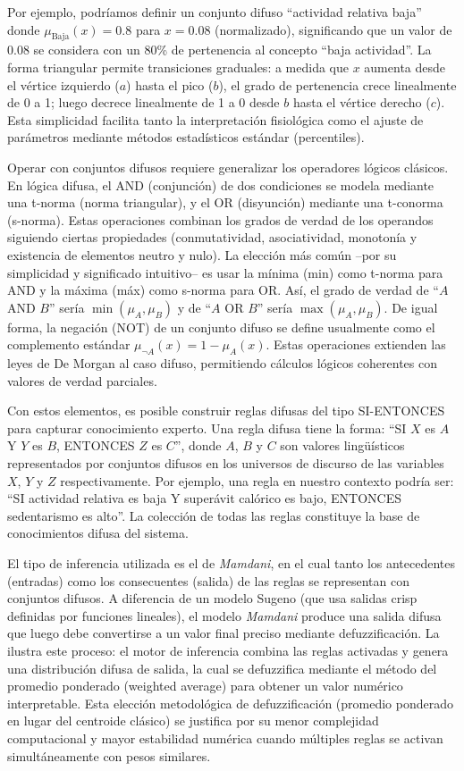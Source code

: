 Por ejemplo, podríamos definir un conjunto difuso ``actividad relativa baja'' donde $\mu_{\text{Baja}}(x) = 0.8$ para $x = 0.08$ (normalizado), significando que un valor de 0.08 se considera con un 80\% de pertenencia al concepto ``baja actividad''. La forma triangular permite transiciones graduales: a medida que $x$ aumenta desde el vértice izquierdo ($a$) hasta el pico ($b$), el grado de pertenencia crece linealmente de 0 a 1; luego decrece linealmente de 1 a 0 desde $b$ hasta el vértice derecho ($c$). Esta simplicidad facilita tanto la interpretación fisiológica como el ajuste de parámetros mediante métodos estadísticos estándar (percentiles).

Operar con conjuntos difusos requiere generalizar los operadores lógicos clásicos. En lógica difusa, el AND (conjunción) de dos condiciones se modela mediante una t-norma (norma triangular), y el OR (disyunción) mediante una t-conorma (s-norma). Estas operaciones combinan los grados de verdad de los operandos siguiendo ciertas propiedades (conmutatividad, asociatividad, monotonía y existencia de elementos neutro y nulo). La elección más común --por su simplicidad y significado intuitivo-- es usar la mínima (min) como t-norma para AND y la máxima (máx) como s-norma para OR. Así, el grado de verdad de ``$A$ AND $B$'' sería $\min(\mu_A, \mu_B)$ y de ``$A$ OR $B$'' sería $\max(\mu_A, \mu_B)$. De igual forma, la negación (NOT) de un conjunto difuso se define usualmente como el complemento estándar $\mu_{\neg A}(x) = 1 - \mu_A(x)$. Estas operaciones extienden las leyes de De Morgan al caso difuso, permitiendo cálculos lógicos coherentes con valores de verdad parciales.

Con estos elementos, es posible construir reglas difusas del tipo SI-ENTONCES para capturar conocimiento experto. Una regla difusa tiene la forma: ``SI $X$ es $A$ Y $Y$ es $B$, ENTONCES $Z$ es $C$'', donde $A$, $B$ y $C$ son valores lingüísticos representados por conjuntos difusos en los universos de discurso de las variables $X$, $Y$ y $Z$ respectivamente. Por ejemplo, una regla en nuestro contexto podría ser: ``SI actividad relativa es baja Y superávit calórico es bajo, ENTONCES sedentarismo es alto''. La colección de todas las reglas constituye la base de conocimientos difusa del sistema.

El tipo de inferencia utilizada es el de \textit{Mamdani}, en el cual tanto los antecedentes (entradas) como los consecuentes (salida) de las reglas se representan con conjuntos difusos. A diferencia de un modelo Sugeno (que usa salidas crisp definidas por funciones lineales), el modelo \textit{Mamdani} produce una salida difusa que luego debe convertirse a un valor final preciso mediante defuzzificación. La  ilustra este proceso: el motor de inferencia combina las reglas activadas y genera una distribución difusa de salida, la cual se defuzzifica mediante el método del promedio ponderado (weighted average) para obtener un valor numérico interpretable. Esta elección metodológica de defuzzificación (promedio ponderado en lugar del centroide clásico) se justifica por su menor complejidad computacional y mayor estabilidad numérica cuando múltiples reglas se activan simultáneamente con pesos similares.

